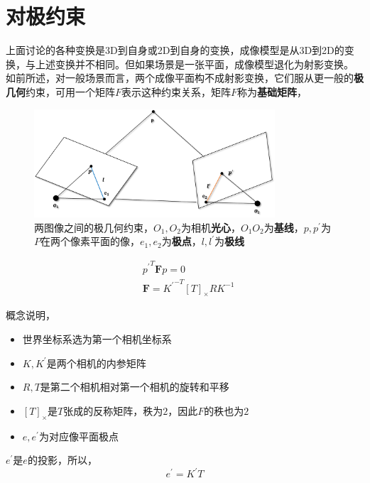 \section{对极约束}
	上面讨论的各种变换是3D到自身或2D到自身的变换，成像模型是从3D到2D的变换，与上述变换并不相同。但如果场景是一张平面，成像模型退化为射影变换。\\

	如前所述，对一般场景而言，两个成像平面构不成射影变换，它们服从更一般的\textbf{极几何}约束，可用一个矩阵$F$表示这种约束关系，矩阵$F$称为\textbf{基础矩阵}，

	\begin{figure}[H]
		\begin{center}
			\includegraphics[width=0.8\textwidth]{images/base_matrix.png}
		\end{center}
		\caption{两图像之间的极几何约束，$O_1,O_2$为相机\textbf{光心}，$O_1O_2$为\textbf{基线}，$p,p^{\prime}$为$P$在两个像素平面的像，$e_1,e_2$为\textbf{极点}，$l,l^{\prime}$为\textbf{极线}}
	\end{figure}

	\begin{align}
		&{p^{\prime}}^T \mathbf{F} p = 0 \\\label{f_constrain}
		&\mathbf{F} = {K^{\prime}}^{-T} [T{}]_{\times} RK^{-1} 
	\end{align}

	概念说明，
	\begin{itemize}
		\item 世界坐标系选为第一个相机坐标系
		\item $K,K^{\prime}$是两个相机的内参矩阵
		\item $R,T$是第二个相机相对第一个相机的旋转和平移
		\item $[T]_{\times}$是$T$张成的反称矩阵，秩为$2$，因此$F$的秩也为$2$
		\item $e,e^\prime$为对应像平面极点
	\end{itemize}

	$e^\prime$是$e$的投影，所以，
	$$
		e^\prime =K^\prime T
	$$

